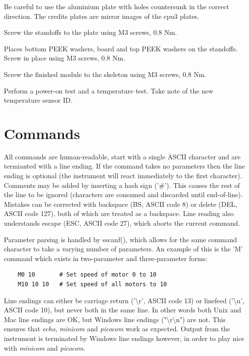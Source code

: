 \documentclass{article}
\begin{document}
Be careful to use the aluminium plate with holes countersunk in the correct direction.
The credits plates are mirror images of the cpu3 plates.

Screw the standoffs to the plate using M3 screws, 0.8 Nm.

Places bottom PEEK washers, board and top PEEK washers on the standoffs.
Screw in place using M3 screws, 0.8 Nm.

Screw the finished module to the skeleton using M3 screws, 0.8 Nm.

Perform a power-on test and a temperature test.
Take note of the new temperature sensor ID.

\section{Commands}

All commands are human-readable, start with a single ASCII character and are termianted with a line ending.
If the command takes no parameters then the line ending is optional (the instrument will react immediately to the first character).
Comments may be added by inserting a hash sign ('\#').
This causes the rest of the line to be ignored (characters are consumed and discarded until end-of-line).
Mistakes can be corrected with backspace (BS, ASCII code 8) or delete (DEL, ASCII code 127), both of which are treated as a backspace.
Line reading also understands escape (ESC, ASCII code 27), which aborts the current command.

Parameter parsing is handled by sscanf(), which allows for the same command character to take a varying number
of parameters. An example of this is the 'M' command which exists in two-parameter and three-parameter forms:

\begin{lstlisting}
    M0 10       # Set speed of motor 0 to 10
    M10 10 10   # Set speed of all motors to 10
\end{lstlisting}


Line endings can either be carriage return ('{\textbackslash}r', ASCII code 13) or linefeed ('{\textbackslash}n', ASCII code 10), but never both in the same line.
In other words both Unix and Mac line endings are OK, but Windows line endings ("{\textbackslash}r{\textbackslash}n") are not.
This ensures that {\it echo}, {\it minicom} and {\it picocom} work as expected.
Output from the instrument is terminated by Windows line endings however, in order to play nice with {\it minicom} and {\it picocom}.
\end{document}
